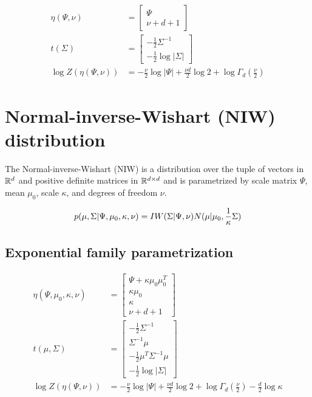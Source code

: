 \begin{align*}
    \eta(\Psi, \nu) &= \begin{bmatrix}\Psi \\ \nu + d + 1\end{bmatrix} \\
    t(\Sigma) &= \begin{bmatrix}-\frac{1}{2}\Sigma^{-1} \\ -\frac{1}{2}\log |\Sigma|\end{bmatrix} \\
    \log Z(\eta(\Psi, \nu)) &= -\frac{\nu}{2}\log |\Psi| + \frac{\nu d}{2}\log 2 + \log \Gamma_d\left(\frac{\nu}{2}\right)
\end{align*}

\section{Normal-inverse-Wishart (NIW) distribution}
\label{sec:stats-niw}

The Normal-inverse-Wishart (NIW) is a
distribution over the tuple of vectors in $\mathbb{R}^d$ and 
positive definite matrices in $\mathbb{R}^{d \times d}$
and is parametrized by
scale matrix $\Psi$,
mean $\mu_0$,
scale $\kappa$,
and degrees of freedom $\nu$.

\begin{align}
        p(\mu, \Sigma | \Psi, \mu_0, \kappa, \nu) &= IW(\Sigma|\Psi,\nu)N(\mu|\mu_0,\frac{1}{\kappa}\Sigma) \\
\end{align}

\subsection{Exponential family parametrization}
\begin{align*}
    \eta(\Psi, \mu_0, \kappa, \nu) &= \begin{bmatrix}\Psi + \kappa\mu_0\mu_0^T\\\kappa \mu_0\\\kappa\\\nu + d + 1\end{bmatrix} \\
    t(\mu, \Sigma) &= \begin{bmatrix}-\frac{1}{2}\Sigma^{-1}\\\Sigma^{-1}\mu\\-\frac{1}{2}\mu^T\Sigma^{-1}\mu\\-\frac{1}{2}\log|\Sigma|\end{bmatrix} \\
    \log Z(\eta(\Psi, \nu)) &= -\frac{\nu}{2}\log |\Psi| + \frac{\nu d}{2}\log 2 + \log \Gamma_d\left(\frac{\nu}{2}\right) - \frac{d}{2} \log \kappa
\end{align*}

